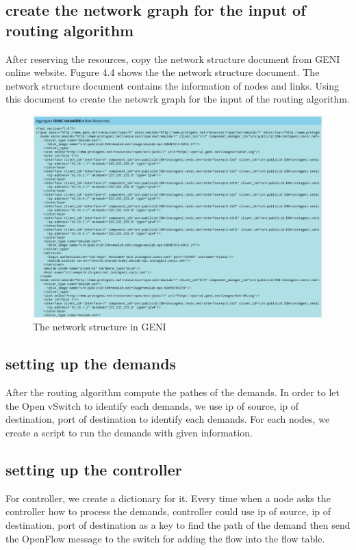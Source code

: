 \documentclass[a4paper,12pt]{report}
\begin{document}
\begin{CJK*}{UTF8}{bkai}
\begin{large}
	     \subsection{create the network graph for the input of routing algorithm}
	     \qquad After reserving the resources, copy the network structure document from GENI online website. Fugure 4.4 shows the the network structure document. The network structure document contains the information of nodes and links. Using this document to create the netowrk graph for the input of the routing algorithm.
	     \begin{figure}
	        \caption{The network structure in GENI}
	        \centering
	          \includegraphics[width=1.0\textwidth]{Raw_resource.png}
	     \end{figure}
	     \subsection{setting up the demands}
	     \qquad After the routing algorithm compute the pathes of the demands. In order to let the Open vSwitch to identify each demands, we use ip of source, ip of destination, port of destination to identify each demands.
	 For each nodes, we create a script to run the demands with given information. 
	 	\subsection{setting up the controller}
	 	\qquad For controller, we create a dictionary for it. Every time when a node asks the controller how to process the demands, controller could use ip of source, ip of destination, port of destination as a key to find the path of the demand then send the OpenFlow message to the switch for adding the flow into the flow table. 

\end{large}
\end{CJK*}
\end{document}
